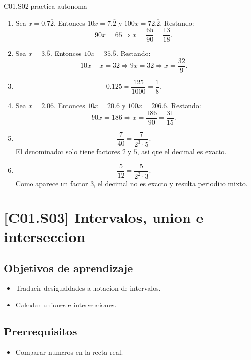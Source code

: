 \begin{fullsolution}{C01.S02 practica autonoma}
\begin{enumerate}[label=\textbf{PX-C01.S02-\arabic*:}, leftmargin=*]
  \item Sea \(x=0.7\overline{2}\). Entonces \(10x=7.\overline{2}\) y \(100x=72.\overline{2}\).
  Restando:
  \[
  90x=65\Longrightarrow x=\frac{65}{90}=\frac{13}{18}.
  \]

  \item Sea \(x=3.\overline{5}\). Entonces \(10x=35.\overline{5}\). Restando:
  \[
  10x-x=32\Longrightarrow 9x=32\Longrightarrow x=\frac{32}{9}.
  \]

  \item
  \[
  0.125=\frac{125}{1000}=\frac{1}{8}.
  \]

  \item Sea \(x=2.0\overline{6}\). Entonces \(10x=20.\overline{6}\) y \(100x=206.\overline{6}\).
  Restando:
  \[
  90x=186\Longrightarrow x=\frac{186}{90}=\frac{31}{15}.
  \]

  \item
  \[
  \frac{7}{40}=\frac{7}{2^3\cdot 5}.
  \]
  El denominador solo tiene factores \(2\) y \(5\), asi que el decimal es exacto.

  \item
  \[
  \frac{5}{12}=\frac{5}{2^2\cdot 3}.
  \]
  Como aparece un factor \(3\), el decimal no es exacto y resulta periodico mixto.
\end{enumerate}
\end{fullsolution}

\section{[C01.S03] Intervalos, union e interseccion}

\subsection*{Objetivos de aprendizaje}
\begin{itemize}
  \item Traducir desigualdades a notacion de intervalos.
  \item Calcular uniones e intersecciones.
\end{itemize}

\subsection*{Prerrequisitos}
\begin{itemize}
  \item Comparar numeros en la recta real.
\end{itemize}

